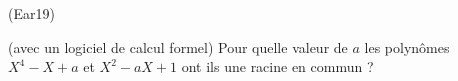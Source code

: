 \begin{tiny}(Ear19)\end{tiny}  (avec un logiciel de calcul formel) Pour quelle valeur de $a$ les polyn{\^o}mes $X^{4}-X+a$ et $X^{2}-aX+1$ ont ils une racine en commun ?